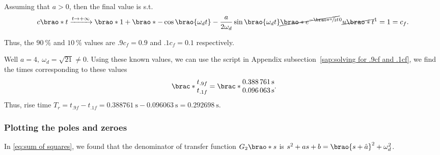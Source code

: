 \documentclass[12pt]{article}
\DeclarePairedDelimiter\brao()%
\DeclarePairedDelimiter\brac[]%
\begin{document}
\begin{enumerate}[(a)]
        Assuming that $a > 0$, then the final value is s.t.
        \begin{equation}
            c\brao*t
            \xrightarrow{t\to+\infty} \brao*{1 + \brao*{-\cos\brao{\omega_d t} - \frac{a}{2\omega_d} \sin\brao{\omega_d t} }\cancel{\brao*{e^{-\brao*{\sfrac{a}2}t}}}^0} \cancel{u\brao*t}^1 = 1 = c_f.
        \end{equation}

        Thus, the $\SI{90}\percent$ and $\SI{10}\percent$ values are $.9c_f = 0.9$ and $.1c_f = 0.1$ respectively.

        Well $a = 4,\ \omega_d = \sqrt{21} \not= 0$.
        Using these known values, we can use the script in Appendix subsection~\ref{sap:solving for .9cf and .1cf}, we find the times corresponding to these values
        \begin{equation}
            \brac*{
                \begin{matrix}
                    t_{.9f} \\*
                    t_{.1f} \\*
                \end{matrix}
            }
            =
            \brac*{
                \begin{matrix}
                    \SI{0.388761}\second \\*
                    \SI{0.096063}\second \\*
                \end{matrix}
            }\rlap.
        \end{equation}
        Thus, rise time $T_r = t_{.9f} - t_{.1f} = \SI{0.388761}\second - \SI{0.096063}\second = \SI{0.292698}\second$.

        \subsubsection{Plotting the poles and zeroes}\label{sss:poles-zeros}

        In \eqref{eq:sum of squares}, we found that the denominator of transfer function $G_2\brao*s$ is $s^2 + as + b = \brao{s + \hat{a}}^2 + \omega_d^2$.


\end{enumerate}
\end{document}
